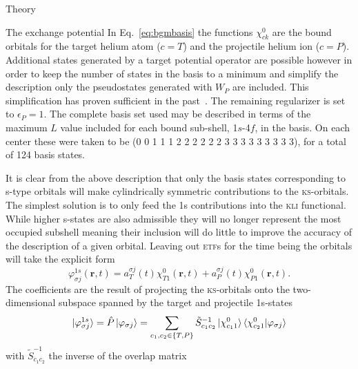\documentclass[aps, pra, reprint, groupedaddress, amsfonts, longbibliography,
               amsmath, amssymb, showpacs, nofootinbib]{revtex4-1}
\begin{document}
\begin{section}{Theory \label{sec:theory}}
\begin{subsection}{The exchange potential \label{sec:xpot}}
      In Eq.~\eqref{eq:bgmbasis} the functions $\chi^{0}_{ck}$ are the bound orbitals for the target
      helium atom ($c = T$) and the projectile helium ion ($c = P$). Additional states generated by a
      target potential operator are possible however in order to keep the number of states in the basis
      to a minimum and simplify the description only the pseudostates generated with $W_P$ are included.
      This simplification has proven sufficient in the past~\cite{bgm-rev}. The remaining regularizer is
      set to $\epsilon_P = 1$. The complete basis set used may be described in terms of the maximum $L$
      value included for each bound sub-shell, 1$s$-4$f$, in the basis. On each center these were taken
      to be (0 0 1 1 1 2 2 2 2 2 2 3 3 3 3 3 3 3 3 3), for a total of 124 basis states.

      It is clear from the above description that only the basis states corresponding to s-type orbitals
      will make cylindrically symmetric contributions to the \textsc{ks}-orbitals. The simplest solution
      is to only feed the 1s contributions into the \textsc{kli} functional. While higher s-states are
      also admissible they will no longer represent the most occupied subshell meaning their inclusion
      will do little to improve the accuracy of the description of a given orbital. Leaving out
      \textsc{etf}s for the time being the orbitals will take the explicit form
      \begin{equation} \label{eq:1sonly}
         \varphi_{\sigma j}^{1s}(\mathbf{r},t) = a^{\sigma j}_T(t) \chi^{0}_{T1}(\mathbf{r},t)
                                               + a^{\sigma j}_P(t) \chi^{0}_{P1}(\mathbf{r},t).
      \end{equation}
      The coefficients are the result of projecting the \textsc{ks}-orbitals onto the two-dimensional
      subspace spanned by the target and projectile 1s-states
      \begin{equation} \label{eq:proj}
         \ket{\varphi^{1s}_{\sigma j}} = \hat{P} \ket{\varphi_{\sigma j}}
                                       = \sum\limits_{c_1, c_2 \in \{T,P\}} \tilde{S}^{-1}_{c_1 c_2}
                                                      \ket{\chi^{0}_{c_1 1}}
                                                      \braket{\chi^{0}_{c_2 1}| \varphi_{\sigma j}}
      \end{equation}
      with $\tilde{S}^{-1}_{c_1 c_2}$ the inverse of the overlap matrix
      \begin{equation} \label{eq:overlap2d}

\end{equation}
\end{subsection}
\end{section}
\end{document}
